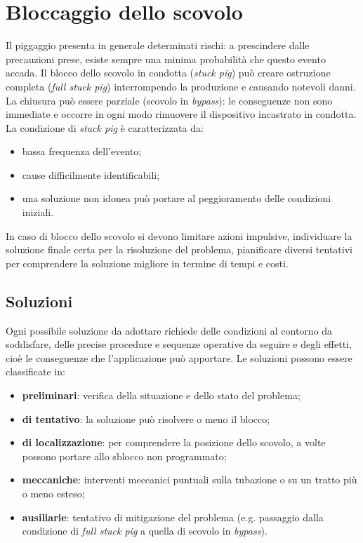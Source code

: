 \section{Bloccaggio dello scovolo}
Il piggaggio presenta in generale determinati rischi: a prescindere dalle precauzioni prese, esiste sempre una minima probabilità che questo evento accada. Il blocco dello scovolo in condotta (\textit{stuck pig}) può creare ostruzione completa (\textit{full stuck pig}) interrompendo la produzione e causando notevoli danni. La chiusura può essere parziale (scovolo in \textit{bypass}): le conseguenze non sono immediate e occorre in ogni modo rimuovere il dispositivo incastrato in condotta.\\
La condizione di \textit{stuck pig} è caratterizzata da:
\begin{itemize}
	\item bassa frequenza dell'evento;
	\item cause difficilmente identificabili;
	\item una soluzione non idonea può portare al peggioramento delle condizioni iniziali.
\end{itemize}
In caso di blocco dello scovolo si devono limitare azioni impulsive, individuare la soluzione finale certa per la risoluzione del problema, pianificare diversi tentativi per comprendere la soluzione migliore in termine di tempi e costi.
\subsection{Soluzioni}
Ogni possibile soluzione da adottare richiede delle condizioni al contorno da soddisfare, delle precise procedure e sequenze operative da seguire e degli effetti, cioè le conseguenze che l'applicazione può apportare. Le soluzioni possono essere classificate in:
\begin{itemize}
	\item \textbf{preliminari}: verifica della situazione e dello stato del problema;
	\item \textbf{di tentativo}: la soluzione può risolvere o meno il blocco;
	\item \textbf{di localizzazione}: per comprendere la posizione dello scovolo, a volte possono portare allo sblocco non programmato;
	\item \textbf{meccaniche}: interventi meccanici puntuali sulla tubazione o su un tratto più o meno esteso;
	\item \textbf{ausiliarie}: tentativo di mitigazione del problema (e.g. passaggio dalla condizione di \textit{full stuck pig} a quella di scovolo in \textit{bypass}).
\end{itemize}

